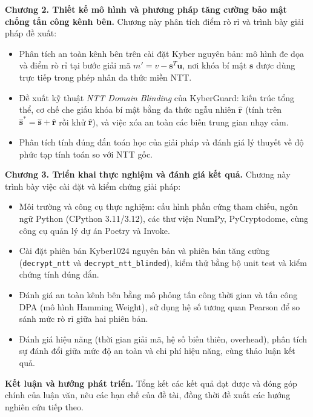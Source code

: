 \documentclass[../LuanVan.tex]{subfiles}
\begin{document}
\textbf{Chương 2. Thiết kế mô hình và phương pháp tăng cường bảo mật chống tấn công kênh bên.} Chương này phân tích điểm rò rỉ và trình bày giải pháp đề xuất:
\begin{itemize}
    \item Phân tích an toàn kênh bên trên cài đặt Kyber nguyên bản: mô hình đe dọa và điểm rò rỉ tại bước giải mã $m' = v - \mathbf{s}^{T}\mathbf{u}$, nơi khóa bí mật $\mathbf{s}$ được dùng trực tiếp trong phép nhân đa thức miền NTT.
    \item Đề xuất kỹ thuật \textit{NTT Domain Blinding} của KyberGuard: kiến trúc tổng thể, cơ chế che giấu khóa bí mật bằng đa thức ngẫu nhiên $\hat{\mathbf{r}}$ (tính trên $\hat{\mathbf{s}}^{*}=\hat{\mathbf{s}}+\hat{\mathbf{r}}$ rồi khử $\hat{\mathbf{r}}$), và việc xóa an toàn các biến trung gian nhạy cảm.
    \item Phân tích tính đúng đắn toán học của giải pháp và đánh giá lý thuyết về độ phức tạp tính toán so với NTT gốc.
\end{itemize}

\textbf{Chương 3. Triển khai thực nghiệm và đánh giá kết quả.} Chương này trình bày việc cài đặt và kiểm chứng giải pháp:
\begin{itemize}
    \item Môi trường và công cụ thực nghiệm: cấu hình phần cứng tham chiếu, ngôn ngữ Python (CPython 3.11/3.12), các thư viện NumPy, PyCryptodome, cùng công cụ quản lý dự án Poetry và Invoke.
    \item Cài đặt phiên bản Kyber1024 nguyên bản và phiên bản tăng cường (\texttt{decrypt\_ntt} và \texttt{decrypt\_ntt\_blinded}), kiểm thử bằng bộ unit test và kiểm chứng tính đúng đắn.
    \item Đánh giá an toàn kênh bên bằng mô phỏng tấn công thời gian và tấn công DPA (mô hình Hamming Weight), sử dụng hệ số tương quan Pearson để so sánh mức rò rỉ giữa hai phiên bản.
    \item Đánh giá hiệu năng (thời gian giải mã, hệ số biến thiên, overhead), phân tích sự đánh đổi giữa mức độ an toàn và chi phí hiệu năng, cùng thảo luận kết quả.
\end{itemize}

\textbf{Kết luận và hướng phát triển.} Tổng kết các kết quả đạt được và đóng góp chính của luận văn, nêu các hạn chế của đề tài, đồng thời đề xuất các hướng nghiên cứu tiếp theo.
\end{document}

